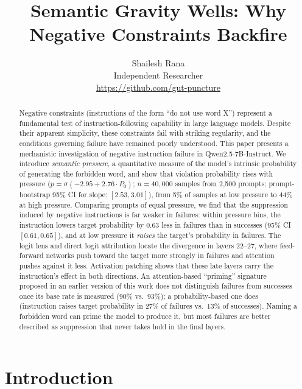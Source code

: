 \documentclass{article}
\title{Semantic Gravity Wells: Why Negative Constraints Backfire}
\author{
  Shailesh Rana\\
  Independent Researcher\\
  \url{https://github.com/gut-puncture}
}
\begin{document}
\raggedbottom
\setlength{\emergencystretch}{1.5em}

\begin{abstract}
Negative constraints (instructions of the form ``do not use word X'') represent a fundamental test of instruction-following capability in large language models. Despite their apparent simplicity, these constraints fail with striking regularity, and the conditions governing failure have remained poorly understood. This paper presents a mechanistic investigation of negative instruction failure in Qwen2.5-7B-Instruct. We introduce \emph{semantic pressure}, a quantitative measure of the model's intrinsic probability of generating the forbidden word, and show that violation probability rises with pressure ($p = \sigma(-2.95 + 2.76 \cdot P_0)$; $n=40{,}000$ samples from 2,500 prompts; prompt-bootstrap 95\% CI for slope: $[2.53, 3.01]$), from 5\% of samples at low pressure to 44\% at high pressure. Comparing prompts of equal pressure, we find that the suppression induced by negative instructions is far weaker in failures: within pressure bins, the instruction lowers target probability by 0.63 less in failures than in successes (95\% CI $[0.61, 0.65]$), and at low pressure it \emph{raises} the target's probability in failures. The logit lens and direct logit attribution locate the divergence in layers 22--27, where feed-forward networks push toward the target more strongly in failures and attention pushes against it less. Activation patching shows that these late layers carry the instruction's effect in both directions. An attention-based ``priming'' signature proposed in an earlier version of this work does not distinguish failures from successes once its base rate is measured (90\% vs.\ 93\%); a probability-based one does (instruction raises target probability in 27\% of failures vs.\ 13\% of successes). Naming a forbidden word can prime the model to produce it, but most failures are better described as suppression that never takes hold in the final layers.
\end{abstract}

\maketitle


\section{Introduction}
\end{document}
